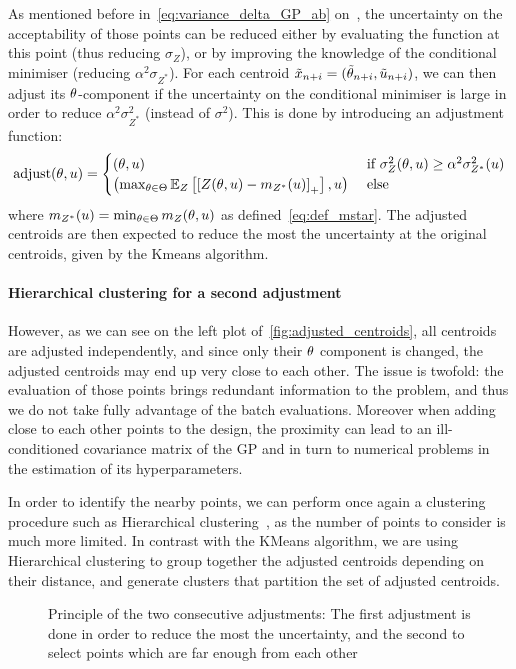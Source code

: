 \documentclass[../../Main_ManuscritThese.tex]{subfiles}
\newcommand\imgpath{/home/victor/acadwriting/Manuscrit/Text/Chapter4/img/}
\begin{document}
As mentioned before in~\cref{eq:variance_delta_GP_ab}
on~, the uncertainty on the
acceptability of those points can be reduced either by evaluating the
function at this point (thus reducing $\sigma_Z$), or by improving the
knowledge of the conditional minimiser (reducing
$\alpha^2 \sigma_{Z^*}$). For each centroid
$\tilde{x}_{n+i} = (\tilde{\theta}_{n+i}, \tilde{u}_{n+i})$, we can
then adjust its $\theta$-component if the uncertainty on the conditional
minimiser is large in order to reduce $\alpha^2 \sigma_{Z^*}^2$
(instead of $\sigma^2$). This is done by introducing an adjustment
function:
\begin{equation}
  \label{eq:adjust_centroid}
  \mathrm{adjust}(\theta,u) =
  \begin{cases}
    (\theta, u) & \text{ if }\sigma^2_Z(\theta, u) \geq \alpha^2\sigma^2_{Z^*}(u)\\
    \left(\max_{\theta\in\Theta} \mathbb{E}_Z\left[\left[Z(\theta,u) - m_{{Z^*}}(u)\right]_+ \right], u \right) & \text{ else}
  \end{cases}
\end{equation}
where $m_{{Z^*}}(u) = \min_{\theta\in\Theta} m_Z(\theta, u)$ as
defined~\eqref{eq:def_mstar}.  The adjusted centroids are then
expected to reduce the most the uncertainty at the original centroids,
given by the Kmeans algorithm.

\paragraph{Hierarchical clustering for a second adjustment}
However, as we can see on the left plot
of~\cref{fig:adjusted_centroids}, all centroids are adjusted
independently, and since only their $\theta$ component is changed, the
adjusted centroids may end up very close to each other. The issue is
twofold: the evaluation of those points brings redundant information
to the problem, and thus we do not take fully advantage of the batch
evaluations. Moreover when adding close to each other points to the
design, the proximity can lead to an ill-conditioned covariance matrix
of the GP and in turn to numerical problems in the estimation of its
hyperparameters.


In order to identify the nearby points, we can perform once
again %
a clustering procedure such as Hierarchical
clustering~\cite{nielsen_hierarchical_2016}, as the number of points
to consider is much more limited. In contrast with the KMeans
algorithm, we are using Hierarchical clustering to group together the
adjusted centroids depending on their distance, and generate clusters
that partition the set of adjusted centroids.
\begin{figure}[ht]
  \centering
  \resizebox{0.9\textwidth}{!}{}
  \caption[Principle of the two consecutive adjustments for batch
  selection]{\label{fig:schema_double_adj} Principle of the two
    consecutive adjustments: The first adjustment is done in order to
    reduce the most the uncertainty, and the second to select points
    which are far enough from each other}
\end{figure}
\end{document}
